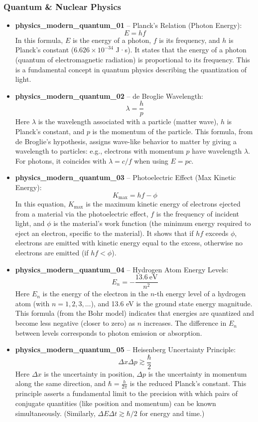 \documentclass[11pt,a4paper]{article}
\begin{document}
\subsubsection{Quantum \& Nuclear Physics}

\begin{itemize}
\item \textbf{physics\_modern\_quantum\_01} -- Planck's Relation (Photon Energy): 
\[E = hf\]
In this formula, $E$ is the energy of a photon, $f$ is its frequency, and $h$ is Planck's constant ($6.626\times10^{-34}$ J·s). It states that the energy of a photon (quantum of electromagnetic radiation) is proportional to its frequency. This is a fundamental concept in quantum physics describing the quantization of light.

\item \textbf{physics\_modern\_quantum\_02} -- de Broglie Wavelength: 
\[\lambda = \frac{h}{p}\]
Here $\lambda$ is the wavelength associated with a particle (matter wave), $h$ is Planck's constant, and $p$ is the momentum of the particle. This formula, from de Broglie's hypothesis, assigns wave-like behavior to matter by giving a wavelength to particles: e.g., electrons with momentum $p$ have wavelength $\lambda$. For photons, it coincides with $\lambda = c/f$ when using $E=pc$.

\item \textbf{physics\_modern\_quantum\_03} -- Photoelectric Effect (Max Kinetic Energy): 
\[K_{\max} = hf - \phi\]
In this equation, $K_{\max}$ is the maximum kinetic energy of electrons ejected from a material via the photoelectric effect, $f$ is the frequency of incident light, and $\phi$ is the material's work function (the minimum energy required to eject an electron, specific to the material). It shows that if $h f$ exceeds $\phi$, electrons are emitted with kinetic energy equal to the excess, otherwise no electrons are emitted (if $h f < \phi$).

\item \textbf{physics\_modern\_quantum\_04} -- Hydrogen Atom Energy Levels: 
\[E_n = -\frac{13.6\ \text{eV}}{n^2}\]
Here $E_n$ is the energy of the electron in the $n$-th energy level of a hydrogen atom (with $n=1,2,3,\dots$), and 13.6 eV is the ground state energy magnitude. This formula (from the Bohr model) indicates that energies are quantized and become less negative (closer to zero) as $n$ increases. The difference in $E_n$ between levels corresponds to photon emission or absorption.

\item \textbf{physics\_modern\_quantum\_05} -- Heisenberg Uncertainty Principle: 
\[\Delta x\Delta p \gtrsim \frac{\hbar}{2}\]
Here $\Delta x$ is the uncertainty in position, $\Delta p$ is the uncertainty in momentum along the same direction, and $\hbar = \frac{h}{2\pi}$ is the reduced Planck's constant. This principle asserts a fundamental limit to the precision with which pairs of conjugate quantities (like position and momentum) can be known simultaneously. (Similarly, $\Delta E\Delta t \gtrsim \hbar/2$ for energy and time.)


\end{itemize}
\end{document}
